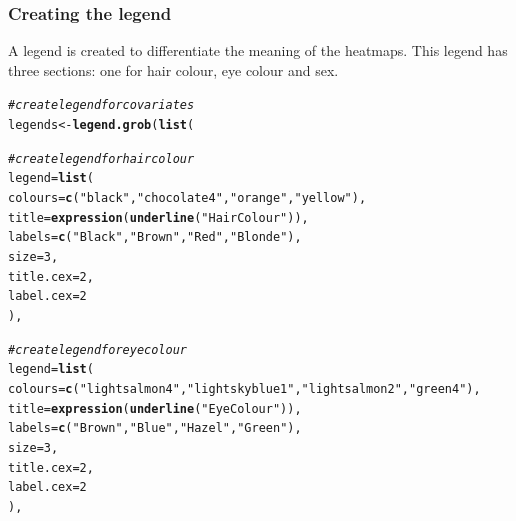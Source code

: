 \documentclass[letterpaper]{report}\usepackage[]{graphicx}\usepackage[]{color}
\makeatletter
\newcommand{\hlnum}[1]{\textcolor[rgb]{0.686,0.059,0.569}{#1}}%
\newcommand{\hlstr}[1]{\textcolor[rgb]{0.192,0.494,0.8}{#1}}%
\newcommand{\hlcom}[1]{\textcolor[rgb]{0.678,0.584,0.686}{\textit{#1}}}%
\newcommand{\hlstd}[1]{\textcolor[rgb]{0.345,0.345,0.345}{#1}}%
\newcommand{\hlkwb}[1]{\textcolor[rgb]{0.69,0.353,0.396}{#1}}%
\newcommand{\hlkwc}[1]{\textcolor[rgb]{0.333,0.667,0.333}{#1}}%
\newcommand{\hlkwd}[1]{\textcolor[rgb]{0.737,0.353,0.396}{\textbf{#1}}}%
\newenvironment{kframe}{%
 \def\at@end@of@kframe{}%
 \ifinner\ifhmode%
  \def\at@end@of@kframe{\end{minipage}}%
  \begin{minipage}{\columnwidth}%
 \fi\fi%
 \def\FrameCommand##1{\hskip\@totalleftmargin \hskip-\fboxsep
 \colorbox{shadecolor}{##1}\hskip-\fboxsep
     \hskip-\linewidth \hskip-\@totalleftmargin \hskip\columnwidth}%
 \MakeFramed {\advance\hsize-\width
   \@totalleftmargin\z@ \linewidth\hsize
   \@setminipage}}%
 {\par\unskip\endMakeFramed%
 \at@end@of@kframe}
\newenvironment{knitrout}{}{} %
\makeatother
\begin{document}
\subsubsection {Creating the legend}
A legend is created to differentiate the meaning of the heatmaps. This legend has three sections: one for hair colour, eye colour and sex.

\begin{knitrout}
\color{fgcolor}\begin{kframe}
\begin{alltt}
\hlcom{# create legend for covariates}
\hlstd{legends} \hlkwb{<-} \hlkwd{legend.grob}\hlstd{(} \hlkwd{list}\hlstd{(}

       \hlcom{# create legend for hair colour}
       \hlkwc{legend} \hlstd{=} \hlkwd{list}\hlstd{(}
               \hlkwc{colours} \hlstd{=} \hlkwd{c}\hlstd{(}\hlstr{"black"}\hlstd{,} \hlstr{"chocolate4"}\hlstd{,} \hlstr{"orange"}\hlstd{,} \hlstr{"yellow"}\hlstd{),}
               \hlkwc{title} \hlstd{=} \hlkwd{expression}\hlstd{(}\hlkwd{underline}\hlstd{(}\hlstr{"Hair Colour"}\hlstd{)),}
               \hlkwc{labels} \hlstd{=} \hlkwd{c}\hlstd{(}\hlstr{"Black"}\hlstd{,} \hlstr{"Brown"}\hlstd{,} \hlstr{"Red"}\hlstd{,} \hlstr{"Blonde"}\hlstd{),}
               \hlkwc{size} \hlstd{=} \hlnum{3}\hlstd{,}
               \hlkwc{title.cex} \hlstd{=} \hlnum{2}\hlstd{,}
               \hlkwc{label.cex} \hlstd{=} \hlnum{2}
               \hlstd{),}

       \hlcom{# create legend for eye colour}
       \hlkwc{legend} \hlstd{=} \hlkwd{list}\hlstd{(}
               \hlkwc{colours} \hlstd{=} \hlkwd{c}\hlstd{(}\hlstr{"lightsalmon4"}\hlstd{,} \hlstr{"lightskyblue1"}\hlstd{,} \hlstr{"lightsalmon2"}\hlstd{,} \hlstr{"green4"}\hlstd{),}
               \hlkwc{title} \hlstd{=} \hlkwd{expression}\hlstd{(}\hlkwd{underline}\hlstd{(}\hlstr{"Eye Colour"}\hlstd{)),}
               \hlkwc{labels} \hlstd{=} \hlkwd{c}\hlstd{(}\hlstr{"Brown"}\hlstd{,} \hlstr{"Blue"}\hlstd{,} \hlstr{"Hazel"}\hlstd{,} \hlstr{"Green"}\hlstd{),}
               \hlkwc{size} \hlstd{=} \hlnum{3}\hlstd{,}
               \hlkwc{title.cex} \hlstd{=} \hlnum{2}\hlstd{,}
               \hlkwc{label.cex} \hlstd{=} \hlnum{2}
               \hlstd{),}


\end{alltt}
\end{kframe}
\end{knitrout}
\end{document}
